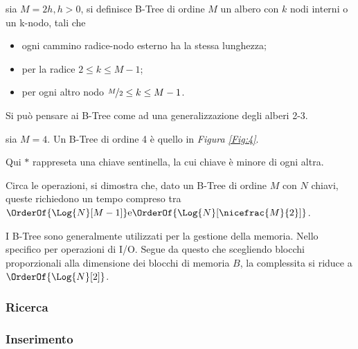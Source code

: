 \documentclass{subfiles}
\begin{document}
\begin{Definition*}
    sia \(M = 2h, h > 0\), si definisce B-Tree di ordine \(M\) un albero con \(k\) nodi interni o un k-nodo,
    tali che
    \begin{itemize}
        \item ogni cammino radice-nodo esterno ha la stessa lunghezza;
        \item per la radice \(2 \le k \le M -1\);
        \item per ogni altro nodo \(\nicefrac{M}{2} \le k \le M -1\).
    \end{itemize}

    \begin{Remark*}
        Si può pensare ai B-Tree come ad una generalizzazione degli alberi 2-3.
    \end{Remark*}
\end{Definition*}
\begin{Example*}
    sia \(M = 4\). Un B-Tree di ordine 4 è quello in \emph{Figura \ref{Fig:4}}.
    \begin{MarginNote}
        Qui \(*\) rappreseta una chiave sentinella, la cui chiave è minore di ogni altra.
    \end{MarginNote}
    
\end{Example*}

Circa le operazioni, si dimostra che, dato un B-Tree di ordine \(M\) con \(N\) chiavi,
queste richiedono un tempo compreso tra \(\OrderOf{\Log{N}[M - 1]} \text{e} \OrderOf{\Log{N}[\nicefrac{M}{2}]}\).

\begin{Remark*}
    I B-Tree sono generalmente utilizzati per la gestione della memoria. Nello specifico per operazioni di I/O.
    Segue da questo che scegliendo blocchi proporzionali alla dimensione dei blocchi di memoria \(B\),
    la complessita si riduce a \(\OrderOf{\Log{N}[2]}\).
\end{Remark*}

\subsubsection{Ricerca}


\subsubsection{Inserimento}

\end{document}
